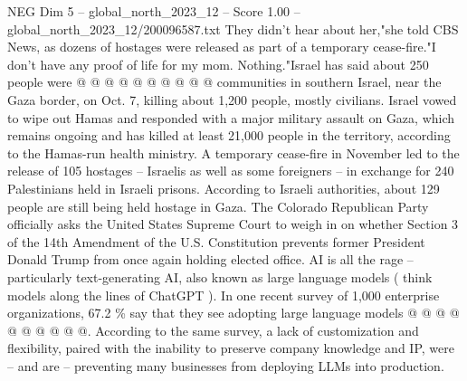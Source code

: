 \begin{textsample}{NEG Dim 5 – global\_north\_2023\_12 – Score 1.00 – global\_north\_2023\_12/200096587.txt}
They didn't hear about her,"she told CBS News, as dozens of hostages were released as part of a temporary cease-fire."I don't have any proof of life for my mom.
Nothing."Israel has said about 250 people were @ @ @ @ @ @ @ @ @ @ communities in southern Israel, near the Gaza border, on Oct. 7, killing about 1,200 people, mostly civilians.
Israel vowed to wipe out Hamas and responded with a major military assault on Gaza, which remains ongoing and has killed at least 21,000 people in the territory, according to the Hamas-run health ministry.
A temporary cease-fire in November led to the release of 105 hostages -- Israelis as well as some foreigners -- in exchange for 240 Palestinians held in Israeli prisons.
According to Israeli authorities, about 129 people are still being held hostage in Gaza.
The Colorado Republican Party officially asks the United States Supreme Court to weigh in on whether Section 3 of the 14th Amendment of the U.S.
Constitution prevents former President Donald Trump from once again holding elected office.
AI is all the rage -- particularly text-generating AI, also known as large language models ( think models along the lines of ChatGPT ).
In one recent survey of 1,000 enterprise organizations, 67.2 \% say that they see adopting large language models @ @ @ @ @ @ @ @ @ @.
According to the same survey, a lack of customization and flexibility, paired with the inability to preserve company knowledge and IP, were -- and are -- preventing many businesses from deploying LLMs into production.

\end{textsample}
